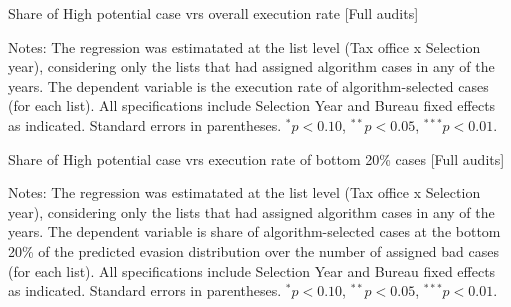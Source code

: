 \documentclass{article}
\newcommand{\OutPath}{Output/}%
\newcommand{\OutPath}{../Output/}%
\begin{document}
\begin{landscape}
\begin{table}[H]\centering
\begin{adjustbox}{max width=1.255\textwidth}
\begin{threeparttable}
\caption{Share of High potential case vrs overall execution rate [Full audits]}
\label{tab:inspector_effort_disc_full}
\footnotesize


\begin{tablenotes}[flushleft]
\footnotesize
\item Notes: The regression was estimatated at the list level (Tax office x Selection year), considering only the lists that had assigned algorithm cases in any of the years. The dependent variable is the execution rate of algorithm-selected cases (for each list). All specifications include Selection Year and Bureau fixed effects as indicated. Standard errors in parentheses. 
$^{*}p<0.10$, $^{**}p<0.05$, $^{***}p<0.01$.
\end{tablenotes}
\end{threeparttable}
\end{adjustbox}
\end{table}

\begin{table}[H]\centering
\begin{adjustbox}{max width=1.255\textwidth}
\begin{threeparttable}
\caption{Share of High potential case vrs execution rate of bottom 20\% cases [Full audits]}
\label{tab:inspector_effort_disc_full}
\footnotesize


\begin{tablenotes}[flushleft]
\footnotesize
\item Notes: The regression was estimatated at the list level (Tax office x Selection year), considering only the lists that had assigned algorithm cases in any of the years. The dependent variable is share of algorithm-selected cases at the bottom 20\% of the predicted evasion distribution over the number of assigned bad cases (for each list). All specifications include Selection Year and Bureau fixed effects as indicated. Standard errors in parentheses. 
$^{*}p<0.10$, $^{**}p<0.05$, $^{***}p<0.01$.
\end{tablenotes}
\end{threeparttable}
\end{adjustbox}
\end{table}



\end{landscape}
\end{document}
